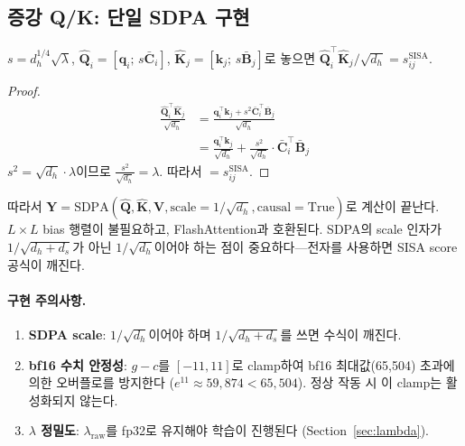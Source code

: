 \documentclass[11pt]{article}
\begin{document}
\subsection{증강 Q/K: 단일 SDPA 구현}

\begin{proposition}
$s = d_h^{1/4}\sqrt{\lambda}$, $\hat{\mathbf{Q}}_i = [\mathbf{q}_i;\, s\bar{\mathbf{C}}_i]$, $\hat{\mathbf{K}}_j = [\mathbf{k}_j;\, s\bar{\mathbf{B}}_j]$로 놓으면 $\hat{\mathbf{Q}}_i^\top \hat{\mathbf{K}}_j / \sqrt{d_h} = s_{ij}^{\text{SISA}}$.
\end{proposition}

\begin{proof}
\begin{align}
\frac{\hat{\mathbf{Q}}_i^\top \hat{\mathbf{K}}_j}{\sqrt{d_h}} &= \frac{\mathbf{q}_i^\top \mathbf{k}_j + s^2 \bar{\mathbf{C}}_i^\top \bar{\mathbf{B}}_j}{\sqrt{d_h}} \\
&= \frac{\mathbf{q}_i^\top \mathbf{k}_j}{\sqrt{d_h}} + \frac{s^2}{\sqrt{d_h}} \cdot \bar{\mathbf{C}}_i^\top \bar{\mathbf{B}}_j
\end{align}
$s^2 = \sqrt{d_h} \cdot \lambda$이므로 $\frac{s^2}{\sqrt{d_h}} = \lambda$. 따라서 $= s_{ij}^{\text{SISA}}$.
\end{proof}

따라서 $\mathbf{Y} = \text{SDPA}(\hat{\mathbf{Q}}, \hat{\mathbf{K}}, \mathbf{V}, \text{scale}=1/\sqrt{d_h}, \text{causal}=\text{True})$로 계산이 끝난다. $L{\times}L$ bias 행렬이 불필요하고, FlashAttention과 호환된다. SDPA의 scale 인자가 $1/\sqrt{d_h + d_s}$가 아닌 $1/\sqrt{d_h}$이어야 하는 점이 중요하다---전자를 사용하면 SISA score 공식이 깨진다.

\paragraph{구현 주의사항.}
\begin{enumerate}[leftmargin=*]
\item \textbf{SDPA scale}: $1/\sqrt{d_h}$이어야 하며 $1/\sqrt{d_h+d_s}$를 쓰면 수식이 깨진다.
\item \textbf{bf16 수치 안정성}: $g-c$를 $[-11, 11]$로 clamp하여 bf16 최대값(65,504) 초과에 의한 오버플로를 방지한다 ($e^{11} \approx 59,874 < 65,504$). 정상 작동 시 이 clamp는 활성화되지 않는다.
\item \textbf{$\lambda$ 정밀도}: $\lambda_{\text{raw}}$를 fp32로 유지해야 학습이 진행된다 (Section~\ref{sec:lambda}).
\end{enumerate}
\end{document}
